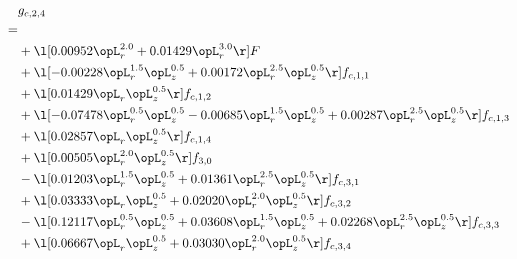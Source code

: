 \begin{alignat}{2} 
\label{eq:g_24_0} 
& g_{c,2,4} \nonumber \\ 
 = \\ 
& + \l[  0.00952 \opL_r^{2.0} +  0.01429 \opL_r^{3.0}  \r] F \nonumber \\ 
& + \l[  -0.00228 \opL_r^{1.5} \opL_z^{0.5} +  0.00172 \opL_r^{2.5} \opL_z^{0.5}  \r] f_{c,1,1} \nonumber \\ 
& + \l[  0.01429 \opL_r \opL_z^{0.5}  \r] f_{c,1,2} \nonumber \\ 
& + \l[  -0.07478 \opL_r^{0.5} \opL_z^{0.5}   -0.00685 \opL_r^{1.5} \opL_z^{0.5} +  0.00287 \opL_r^{2.5} \opL_z^{0.5}  \r] f_{c,1,3} \nonumber \\ 
& + \l[  0.02857 \opL_r \opL_z^{0.5}  \r] f_{c,1,4} \nonumber \\ 
& + \l[  0.00505 \opL_r^{2.0} \opL_z^{0.5}  \r] f_{3,0} \nonumber \\ 
& - \l[  0.01203 \opL_r^{1.5} \opL_z^{0.5} +  0.01361 \opL_r^{2.5} \opL_z^{0.5}  \r] f_{c,3,1} \nonumber \\ 
& + \l[  0.03333 \opL_r \opL_z^{0.5} +  0.02020 \opL_r^{2.0} \opL_z^{0.5}  \r] f_{c,3,2} \nonumber \\ 
& - \l[  0.12117 \opL_r^{0.5} \opL_z^{0.5} +  0.03608 \opL_r^{1.5} \opL_z^{0.5} +  0.02268 \opL_r^{2.5} \opL_z^{0.5}  \r] f_{c,3,3} \nonumber \\ 
& + \l[  0.06667 \opL_r \opL_z^{0.5} +  0.03030 \opL_r^{2.0} \opL_z^{0.5}  \r] f_{c,3,4} \nonumber \\ 
\end{alignat} 


